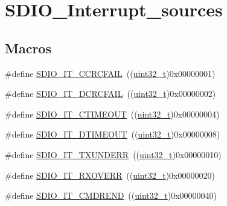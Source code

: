 \hypertarget{group___s_d_i_o___interrupt__sources}{}\section{S\+D\+I\+O\+\_\+\+Interrupt\+\_\+sources}
\label{group___s_d_i_o___interrupt__sources}
\subsection*{Macros}
\begin{DoxyCompactItemize}
\item 
\#define \hyperlink{group___s_d_i_o___interrupt__sources_gabb076105e18355a260c40a379511e72f}{S\+D\+I\+O\+\_\+\+I\+T\+\_\+\+C\+C\+R\+C\+F\+A\+IL}~((\hyperlink{_p_e___types_8h_a33594304e786b158f3fb30289278f5af}{uint32\+\_\+t})0x00000001)
\item 
\#define \hyperlink{group___s_d_i_o___interrupt__sources_gaf3321305cb4e24419185a4b92ead299a}{S\+D\+I\+O\+\_\+\+I\+T\+\_\+\+D\+C\+R\+C\+F\+A\+IL}~((\hyperlink{_p_e___types_8h_a33594304e786b158f3fb30289278f5af}{uint32\+\_\+t})0x00000002)
\item 
\#define \hyperlink{group___s_d_i_o___interrupt__sources_ga3c2fdef0993f10e65d4fddbdf71febed}{S\+D\+I\+O\+\_\+\+I\+T\+\_\+\+C\+T\+I\+M\+E\+O\+UT}~((\hyperlink{_p_e___types_8h_a33594304e786b158f3fb30289278f5af}{uint32\+\_\+t})0x00000004)
\item 
\#define \hyperlink{group___s_d_i_o___interrupt__sources_gaf5ce4bfa8459ccbe892791e5cdc26a6f}{S\+D\+I\+O\+\_\+\+I\+T\+\_\+\+D\+T\+I\+M\+E\+O\+UT}~((\hyperlink{_p_e___types_8h_a33594304e786b158f3fb30289278f5af}{uint32\+\_\+t})0x00000008)
\item 
\#define \hyperlink{group___s_d_i_o___interrupt__sources_ga93d4dbe3162b8507b2834a3e29e6c648}{S\+D\+I\+O\+\_\+\+I\+T\+\_\+\+T\+X\+U\+N\+D\+E\+RR}~((\hyperlink{_p_e___types_8h_a33594304e786b158f3fb30289278f5af}{uint32\+\_\+t})0x00000010)
\item 
\#define \hyperlink{group___s_d_i_o___interrupt__sources_ga272953292e1b43b2108b00e75db76512}{S\+D\+I\+O\+\_\+\+I\+T\+\_\+\+R\+X\+O\+V\+E\+RR}~((\hyperlink{_p_e___types_8h_a33594304e786b158f3fb30289278f5af}{uint32\+\_\+t})0x00000020)
\item 
\#define \hyperlink{group___s_d_i_o___interrupt__sources_ga6df3bb694dc00e250cd22e16a03d6910}{S\+D\+I\+O\+\_\+\+I\+T\+\_\+\+C\+M\+D\+R\+E\+ND}~((\hyperlink{_p_e___types_8h_a33594304e786b158f3fb30289278f5af}{uint32\+\_\+t})0x00000040)

\end{DoxyCompactItemize}
